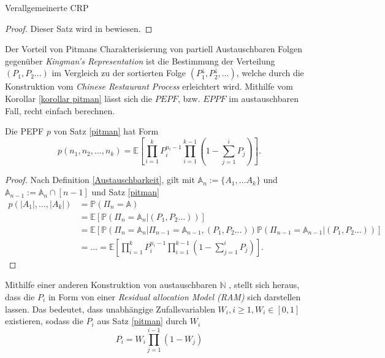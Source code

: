 \begin{section}{Verallgemeinerte CRP}
\begin{proof}
    Dieser Satz wird in \cite{pitman1995exchangeable} bewiesen.
\end{proof}
\begin{Bemerkung}
    Der Vorteil von Pitmans Charakterisierung von partiell Austauschbaren Folgen gegenüber \textit{Kingman's Representation} ist die Bestimmung der Verteilung $(P_1,P_2...)$ im Vergleich zu der sortierten Folge $(P^\downarrow_1,P^\downarrow_2,...)$, welche durch die Konstruktion vom \textit{Chinese Restaurant Process} erleichtert wird. Mithilfe vom Korollar \ref{korollar pitman} lässt sich die $PEPF$, bzw. $EPPF$ im austauschbaren Fall, recht einfach berechnen.
\end{Bemerkung}
\begin{Korollar}
    \label{korollar pitman}
    Die PEPF $p$ von Satz \ref{pitman} hat Form
    \begin{equation}
    \label{PEPF expected value}    
    p(n_1,n_2,...,n_k) = \mathbb{E}\left[\prod_{i=1}^{k}P_i^{n_i-1}\prod_{i=1}^{k-1}(1-\sum_{j=1}^{i}P_j)\right].
    \end{equation}
\end{Korollar}
\begin{proof}
    Nach Definition \ref{Austauschbarkeit}, gilt mit $\mathbb{A}_n:= \{A_1,...A_k\}$ und $\mathbb{A}_{n-1}:= \mathbb{A}_n \cap [n-1]$ und Satz \ref{pitman}
    \begin{align*}
    p(|A_1|,...,|A_k|) &= \mathbb{P}(\Pi_n = \mathbb{A}) \\
    &= \mathbb{E}\left[\mathbb{P}(\Pi_n = \mathbb{A}_n|(P_1,P_2...))\right]  \\
    &= \mathbb{E}\left[\mathbb{P}(\Pi_n = \mathbb{A}_n|\Pi_{n-1} = \mathbb{A}_{n-1},(P_1,P_2...))\mathbb{P}(\Pi_{n-1} = \mathbb{A}_{n-1}|(P_1,P_2...))\right] \\
    &=... =  \mathbb{E}\left[\prod_{i=1}^{k}P_i^{n_i-1}\prod_{i=1}^{k-1}(1-\sum_{j=1}^{i}P_j)\right].
\end{align*}
\end{proof}
Mithilfe einer anderen Konstruktion von austauschbaren $\mathbb{N}$ \cite[Konstruktion 16]{pitman1995exchangeable}, stellt sich heraus, dass die $P_i$ in Form von einer \textit{Residual allocation Model (RAM)} sich darstellen lassen. Das bedeutet, dass unabhängige Zufallsvariablen $W_i, i \geq 1, W_i \in [0,1]$ existieren, sodass die $P_i$ aus Satz \ref{pitman} durch $W_i$
\begin{equation}
    \label{RAM probability}
    P_i = W_i\prod_{j=1}^{i-1} (1-W_j)
\end{equation}

\end{section}

